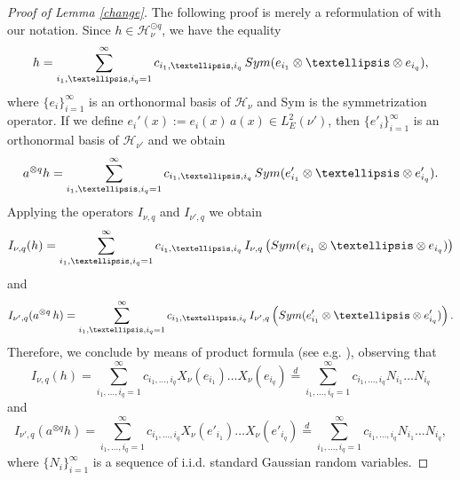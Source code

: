 \documentclass[12pt]{article}
\DeclareMathOperator{\1}{1}
\theoremstyle{plain}
\theoremstyle{definition}
\begin{document}
\begin{proof}[Proof of Lemma \ref{change}] The following proof is merely a reformulation of \cite[Theorem 4.5]{M81} with our notation. Since $h\in \mathcal{H}_{\nu}^{\odot q}$, we have the equality 
    \[
    h=\sum_{i_1,\dots,i_q=1}^\infty c_{i_1,\dots,i_q} \,{\rm Sym}(e_{i_1}\otimes \dots \otimes e_{i_q}),
    \]
    where $\{e_i\}_{i=1}^\infty$ is an orthonormal basis of $\mathcal{H}_{\nu}$ and Sym is the symmetrization operator. If we define $e_i'(x):=e_i(x)\, a(x)\in L_E^2(\nu')$, then $\{e'_i\}_{i=1}^\infty$ is an orthonormal basis of $\mathcal{H}_{\nu'}$ and we obtain 
    \[
    a^{\otimes q} h=\sum _{i_1,\dots,i_q=1}^\infty c_{i_1,\dots,i_q} \,{\rm Sym}(e'_{i_1}\otimes \dots \otimes e'_{i_q}).
    \]
    Applying the operators $I_{\nu,q}$ and $I_{\nu',q}$ we obtain 
    \[
    I_{\nu,q}(h)=\sum_{i_1,\dots,i_q=1}^\infty c_{i_1,\dots,i_q} \,I_{\nu,q}\left({\rm Sym}(e_{i_1}\otimes \dots \otimes e_{i_q})\right)
    \]
    and
    \[
    I_{\nu',q}(a^{\otimes q}\,h)=\sum_{i_1,\dots,i_q=1}^\infty c_{i_1,\dots,i_q} \,I_{\nu',q}\left({\rm Sym}(e'_{i_1}\otimes \dots \otimes e'_{i_q})\right).
    \]
    Therefore, we conclude by means of product formula (see e.g. \cite{bluebook}), observing that
    \[
    I_{\nu,q}(h)=\sum_{i_1,\dots,i_q=1}^\infty c_{i_1,\dots,i_q} X_{\nu}(e_{i_1}) \dots  X_{\nu}(e_{i_q})\overset{d}{=}\sum_{i_1,\dots,i_q=1}^\infty c_{i_1,\dots,i_q} N_{i_1} \dots  N_{i_q}
    \]
    and
    \[
    I_{\nu',q}(a^{\otimes q}h)=\sum_{i_1,\dots,i_q=1}^\infty c_{i_1,\dots,i_q} X_{\nu}(e'_{i_1}) \dots  X_{\nu}(e'_{i_q})\overset{d}{=}\sum_{i_1,\dots,i_q=1}^\infty c_{i_1,\dots,i_q} N_{i_1} \dots  N_{i_q},
    \]
    where $\{N_{i}\}_{i=1}^\infty$ is a sequence of i.i.d. standard Gaussian random variables.
\end{proof}
\end{document}
